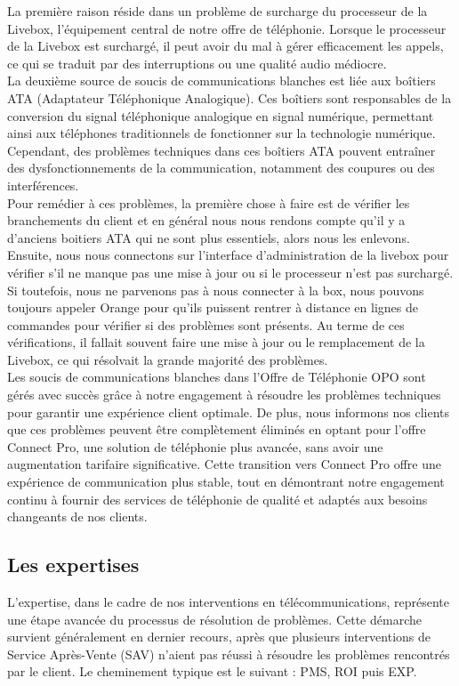 \documentclass[12pt, a4paper]{article}
\begin{document}
La première raison réside dans un problème de surcharge du
processeur de la Livebox, l'équipement central de notre offre
de téléphonie. Lorsque le processeur de la Livebox est surchargé,
il peut avoir du mal à gérer efficacement les appels, ce qui se
traduit par des interruptions ou une qualité audio médiocre.\\

La deuxième source de soucis de communications blanches est
liée aux boîtiers ATA (Adaptateur Téléphonique Analogique).
Ces boîtiers sont responsables de la conversion du signal
téléphonique analogique en signal numérique, permettant ainsi
aux téléphones traditionnels de fonctionner sur la technologie
numérique. Cependant, des problèmes techniques dans ces boîtiers
ATA pouvent entraîner des dysfonctionnements de la communication,
notamment des coupures ou des interférences.\\

Pour remédier à ces problèmes, la première chose à faire est 
de vérifier les branchements du client et 
en général nous nous rendons compte qu'il y a d'anciens 
boitiers ATA qui ne sont plus essentiels, alors nous 
les enlevons. Ensuite, nous
nous connectons sur l'interface d'administration de la livebox 
pour vérifier s'il ne manque pas une mise à jour ou si le 
processeur n'est pas surchargé. Si toutefois, nous 
ne parvenons pas à nous connecter à la box, nous pouvons 
toujours appeler Orange pour qu'ils puissent rentrer 
à distance en lignes de commandes pour 
vérifier si des problèmes sont présents.
Au terme de ces vérifications, il fallait souvent 
faire une mise à jour ou le remplacement de la Livebox, 
ce qui résolvait la grande majorité des problèmes.\\

Les soucis de communications blanches dans l'Offre de Téléphonie
\gls{OPO} sont gérés avec succès grâce à notre engagement à résoudre
les problèmes techniques pour garantir une expérience client
optimale. De plus, nous informons nos clients que ces problèmes peuvent
être complètement éliminés en optant pour l'offre Connect Pro,
une solution de téléphonie plus avancée, sans avoir une
augmentation tarifaire significative. Cette transition vers
Connect Pro offre une expérience de communication plus stable,
tout en démontrant notre engagement continu à fournir des
services de téléphonie de qualité et adaptés aux besoins
changeants de nos clients.

\newpage
\subsection{Les expertises}
L'expertise, dans le cadre de nos interventions en télécommunications,
représente une étape avancée du processus de résolution de problèmes.
Cette démarche survient généralement en dernier recours, après que
plusieurs interventions de Service Après-Vente (SAV) n'aient pas
réussi à résoudre les problèmes rencontrés par le client. Le cheminement
typique est le suivant : \gls{PMS}, \gls{ROI} puis \gls{EXP}.\\
\end{document}
